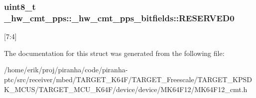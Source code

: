 \subsubsection[{\texorpdfstring{R\+E\+S\+E\+R\+V\+E\+D0}{RESERVED0}}]{\setlength{\rightskip}{0pt plus 5cm}uint8\+\_\+t \+\_\+hw\+\_\+cmt\+\_\+pps\+::\+\_\+hw\+\_\+cmt\+\_\+pps\+\_\+bitfields\+::\+R\+E\+S\+E\+R\+V\+E\+D0}\hypertarget{struct__hw__cmt__pps_1_1__hw__cmt__pps__bitfields_a86009a4b4d39ea9eff64f8061c4dfc6f}{}\label{struct__hw__cmt__pps_1_1__hw__cmt__pps__bitfields_a86009a4b4d39ea9eff64f8061c4dfc6f}
\mbox{[}7\+:4\mbox{]} 

The documentation for this struct was generated from the following file\+:\begin{DoxyCompactItemize}
\item 
/home/erik/proj/piranha/code/piranha-\/ptc/src/receiver/mbed/\+T\+A\+R\+G\+E\+T\+\_\+\+K64\+F/\+T\+A\+R\+G\+E\+T\+\_\+\+Freescale/\+T\+A\+R\+G\+E\+T\+\_\+\+K\+P\+S\+D\+K\+\_\+\+M\+C\+U\+S/\+T\+A\+R\+G\+E\+T\+\_\+\+M\+C\+U\+\_\+\+K64\+F/device/device/\+M\+K64\+F12/M\+K64\+F12\+\_\+cmt.\+h\end{DoxyCompactItemize}
